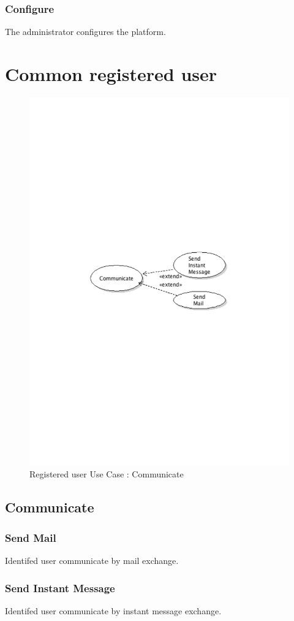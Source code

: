 		\subsubsection{Configure}
			The administrator configures the platform.
\newpage
\section{Common registered user}
	\begin{figure}[ht]
		\begin{center}
			\includegraphics[width=\textwidth,  trim=2cm 12cm 2cm 12cm]{UML_figure/UC/common/UC_Common_Communicate.pdf}
			\caption{Registered user Use Case : Communicate}
		\end{center}
	\end{figure}
	\subsection{Communicate}
		\subsubsection{Send Mail}
			Identifed user communicate by mail exchange.
		\subsubsection{Send Instant Message}
			Identifed user communicate by instant message exchange.
